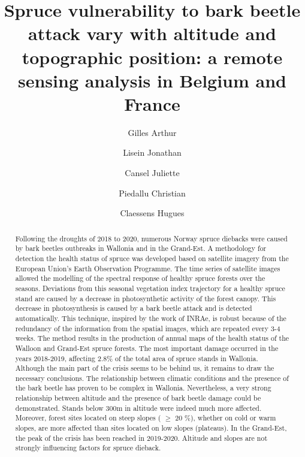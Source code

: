 \documentclass[3p,procedia]{elsarticle}
\begin{document}
\begin{frontmatter}

\author[label1]{Gilles Arthur}
\author[label1]{Lisein Jonathan}
\author[label2]{Cansel Juliette}
\author[label3]{Piedallu Christian}
\author[label1]{Claessens Hugues}




\title{Spruce vulnerability to bark beetle attack vary with altitude and topographic position: a remote sensing analysis in Belgium and France}
\begin{abstract}
	
\iffalse
Following the droughts of 2018 to 2020, numerous Norway spruce diebacks were caused by bark beetles 
outbreaks in Wallonia and in the Grand-Est. 
A methodology for detection the health status of spruce was developed based on satellite imagery from the European Union's Earth Observation Programme.
The time series of satellite images allowed the modelling of the spectral response of healthy spruce forests over the seasons. Deviations from this seasonal vegetation index trajectory for a healthy spruce stand are caused by a decrease in photosynthetic activity of the forest canopy.
This decrease in photosynthesis is caused by a bark beetle attack and is detected automatically.
This technique, inspired by the work of INRAe, is robust because of the redundancy of the information from the spatial images, which are repeated every 3-4 weeks. 
The method results in the production of annual maps of the health status of the Walloon and Grand-Est spruce forests.
The most important damage occurred in the years 2018-2019, affecting 2.8\% of the total area of spruce stands in Wallonia.
Although the main part of the crisis seems to be behind us, it remains to draw the necessary conclusions.
The relationship between climatic conditions and the presence of the bark beetle has proven to be complex in Wallonia.
Nevertheless, a very strong relationship between altitude and the presence of bark beetle damage could be demonstrated.
Stands below 300m in altitude were indeed much more affected.
Moreover, forest sites located on steep slopes ( $\ge$  20 \%), whether on cold or warm slopes, are more affected than sites located on low slopes (plateaus).
In the Grand-Est, the peak of the crisis has been reached in 2019-2020. Altitude and slopes are not strongly influencing factors for spruce dieback. 


\end{abstract}
\end{frontmatter}
\end{document}
